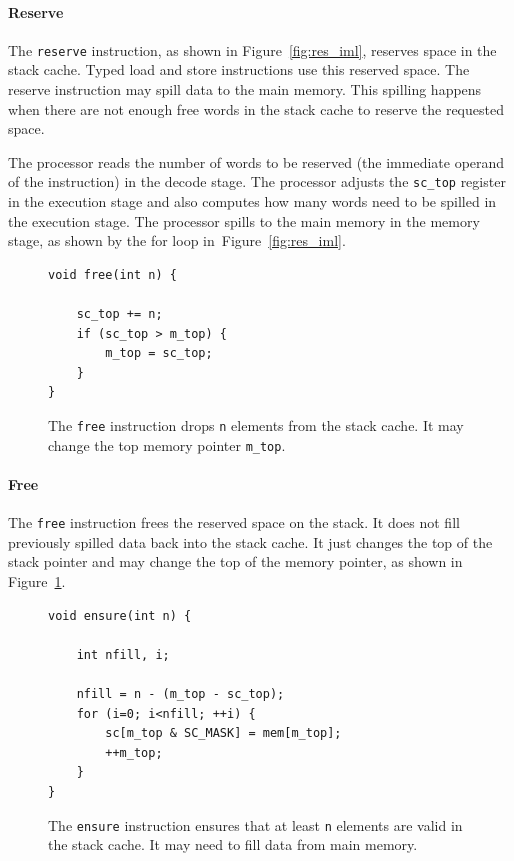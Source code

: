 \documentclass[a4paper,fontsize=10pt,twoside,DIV15,BCOR12mm,headinclude=true,footinclude=false,pagesize,bibtotoc]{scrbook}
\newcommand{\code}[1]{{\texttt{#1}}}
\begin{document}
\paragraph{Reserve} The \code{reserve} instruction, as shown in Figure~\ref{fig:res_iml},
reserves space in the stack cache. Typed load and store instructions use
this reserved space. The reserve instruction may spill data to the
main memory. This spilling happens when there are not enough free words in the
stack cache to reserve the requested space.

The processor reads the number of words to be reserved
(the immediate operand of the instruction) in the decode stage.
The processor adjusts the \code{sc\_top} register in the execution
stage and also computes how many words need to be spilled in the
execution stage. The processor spills to the main memory
in the memory stage, as shown by the for loop in~Figure~\ref{fig:res_iml}.

\begin{figure}
\begin{lstlisting}
void free(int n) {

    sc_top += n;
    if (sc_top > m_top) {
        m_top = sc_top;
    }
}
\end{lstlisting}
	\caption{The \code{free} instruction drops \code{n}
	elements from the stack cache. It may change the top memory
	pointer \code{m\_top}.}
 	 \label{fig:free_iml}
\end{figure}

\paragraph{Free} The \code{free} instruction frees the reserved
space on the stack. It does not fill previously spilled data back into the stack cache.
It just changes the top of the stack pointer and may change the top of the memory
pointer, as shown in Figure~\ref{fig:free_iml}.


\begin{figure}
\begin{lstlisting}
void ensure(int n) {

    int nfill, i;

    nfill = n - (m_top - sc_top);
    for (i=0; i<nfill; ++i) {
        sc[m_top & SC_MASK] = mem[m_top];
        ++m_top;
    }
}
\end{lstlisting}
	\caption{The \code{ensure} instruction ensures that
	at least \code{n} elements are valid in the stack cache.
	It may need to fill data from main memory.}
 	\label{fig:ens_iml}
\end{figure}
\end{document}

